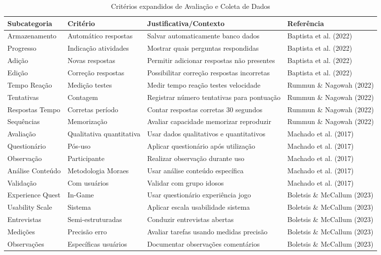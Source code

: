 \begin{table}[H]
\begin{table}[H]
\centering
\caption{Critérios expandidos de Avaliação e Coleta de Dados}
\label{tab:avaliacao_expandida}
\begin{tabular}{p{2.5cm}p{3.5cm}p{4.5cm}p{2.5cm}}
\hline
\textbf{Subcategoria} & \textbf{Critério} & \textbf{Justificativa/Contexto} & \textbf{Referência} \\ \hline
Armazenamento & Automático respostas & Salvar automaticamente banco dados & Baptista et al. (2022) \\
Progresso & Indicação atividades & Mostrar quais perguntas respondidas & Baptista et al. (2022) \\
Adição & Novas respostas & Permitir adicionar respostas não presentes & Baptista et al. (2022) \\
Edição & Correção respostas & Possibilitar correção respostas incorretas & Baptista et al. (2022) \\
Tempo Reação & Medição testes & Medir tempo reação testes velocidade & Rummun \& Nagowah (2022) \\
Tentativas & Contagem & Registrar número tentativas para pontuação & Rummun \& Nagowah (2022) \\
Respostas Tempo & Corretas período & Contar respostas corretas 30 segundos & Rummun \& Nagowah (2022) \\
Sequências & Memorização & Avaliar capacidade memorizar reproduzir & Rummun \& Nagowah (2022) \\
Avaliação & Qualitativa quantitativa & Usar dados qualitativos e quantitativos & Machado et al. (2017) \\
Questionário & Pós-uso & Aplicar questionário após utilização & Machado et al. (2017) \\
Observação & Participante & Realizar observação durante uso & Machado et al. (2017) \\
Análise Conteúdo & Metodologia Moraes & Usar análise conteúdo específica & Machado et al. (2017) \\
Validação & Com usuários & Validar com grupo idosos & Machado et al. (2017) \\
Experience Quest & In-Game & Usar questionário experiência jogo & Boletsis \& McCallum (2023) \\
Usability Scale & Sistema & Aplicar escala usabilidade sistema & Boletsis \& McCallum (2023) \\
Entrevistas & Semi-estruturadas & Conduzir entrevistas abertas & Boletsis \& McCallum (2023) \\
Medições & Precisão erro & Avaliar tarefas usando medidas precisão & Boletsis \& McCallum (2023) \\
Observações & Específicas usuários & Documentar observações comentários & Boletsis \& McCallum (2023) \\
\hline
\end{tabular}
\end{table}


\end{table}
